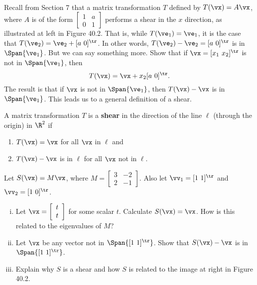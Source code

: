 \begin{activity} \label{act:JCF_shears} ~
\ba
\item Recall from Section 7 that a matrix transformation $T$ defined by $T(\vx) = A\vx$, where $A$ is of the form $\left[ \begin{array}{cc} 1&a\\0&1 \end{array} \right]$ performs a shear in the $x$ direction, as illustrated at left in Figure 40.2.  That is, while $T(\ve_1) = \ve_1$, it is the case that $T(\ve_2) = \ve_2 + [a \ 0]^{\tr}$. In other words, $T(\ve_2)-\ve_2 = [a \ 0]^{\tr}$ is in $\Span \{\ve_1\}$. But we can say something more. Show that if 
$\vx = [x_1 \ x_2]^{\tr}$ is not in $\Span \{\ve_1\}$, then 
\[T(\vx) = \vx + x_2[a \ 0]^{\tr}.\]
The result is that if $\vx$ is not in $\Span \{\ve_1\}$, then $T(\vx) - \vx$ is in $\Span \{\ve_1\}$. This leads us to a general definition of a shear.

\begin{definition} A matrix transformation $T$ is a \textbf{shear} in the direction of the line $\ell$ (through the origin) in $\R^2$ if
\begin{enumerate}
\item $T(\vx) = \vx$ for all $\vx$ in $\ell$ and 
\item $T(\vx) - \vx$ is in $\ell$ for all $\vx$ not in $\ell$.
\end{enumerate}
\end{definition}

\item Let $S(\vx) = M\vx$, where $M = \left[ \begin{array}{cr} 3&-2\\2&-1 \end{array} \right]$. Also let $\vv_1 = [1 \ 1]^{\tr}$ and $\vv_2 = [1 \ 0]^{\tr}$. 
	\begin{enumerate}[i.]
	\item Let $\vx = \left[ \begin{array}{c} t\\t \end{array} \right]$ for some scalar $t$. Calculate $S(\vx) = \vx$. How is this related to the eigenvalues of $M$?
	

	\item Let $\vx$ be any vector not in $\Span\{ [1 \ 1]^{\tr}\}$.  Show that $S(\vx) - \vx$ is in $\Span\{ [1 \ 1]^{\tr}\}$. 
	
	
	\item Explain why $S$ is a shear and how $S$ is related to the image at right in Figure 40.2. %


	\end{enumerate}

\ea

\end{activity}


